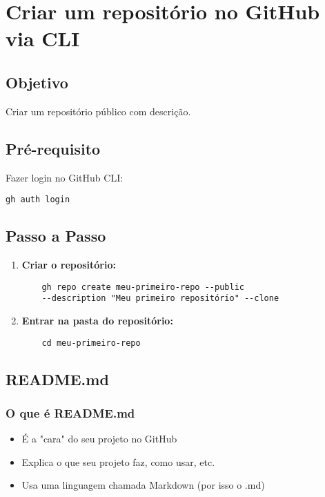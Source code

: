 \section{Criar um repositório no GitHub via CLI}

\subsection{Objetivo}
Criar um repositório público com descrição.

\subsection{Pré-requisito}
Fazer login no GitHub CLI:
\begin{verbatim}
gh auth login
\end{verbatim}

\subsection{Passo a Passo}
\begin{enumerate}
    \item \textbf{Criar o repositório:}
    \begin{verbatim}
    gh repo create meu-primeiro-repo --public 
    --description "Meu primeiro repositório" --clone
    \end{verbatim}
    
    \item \textbf{Entrar na pasta do repositório:}
    \begin{verbatim}
    cd meu-primeiro-repo
    \end{verbatim}
\end{enumerate}

\subsection{README.md}

\subsubsection{O que é README.md}
\begin{itemize}
    \item É a "cara" do seu projeto no GitHub
    \item Explica o que seu projeto faz, como usar, etc.
    \item Usa uma linguagem chamada Markdown (por isso o .md)
\end{itemize}

